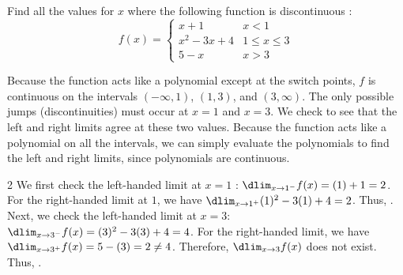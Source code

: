 \documentclass{book}
\begin{document}
\begin{Exam} Find all the values for $x$ where the following function is discontinuous : \[f(x) = \begin{cases} x+1 & x< 1\\ x^2-3x+4  & 1\le x\le 3\\ 5-x & x > 3\end{cases}\]

Because the function acts like a polynomial except at the switch points, $f$ is continuous on the intervals $(-\infty, 1)$, $(1,3)$, and $(3, \infty)$. The only possible jumps (discontinuities) must occur at $x=1$ and $x=3$. We check to see that the left and right limits agree at these two values. Because the function acts like a polynomial on all the intervals, we can simply evaluate the polynomials to find the left and right limits, since polynomials are continuous.
\begin{multicols}{2}
We first check the left-handed limit at $x=1$ : $\dlim_{x\to 1^-} f(x) = (1)+1 = 2$. For the right-handed limit at $1$, we have $\dlim_{x\to 1^+} (1)^2-3(1)+4 = 2$. Thus, . Next, we check the left-handed limit at $x=3$: $\dlim_{x\to 3^-} f(x) = (3)^2-3(3) + 4 = 4$. For the right-handed limit, we have $\dlim_{x\to 3^+} f(x) = 5 - (3) = 2 \neq 4$. Therefore, $\dlim_{x\to 3}f(x)$ does not exist. Thus, .\\

\begin{center}
\end{center}
\end{multicols}
\end{Exam}

\vfill
{}
\pagebreak
\end{document}
